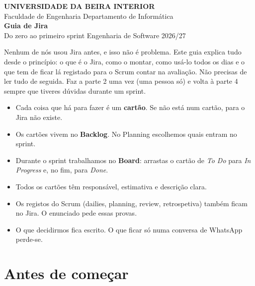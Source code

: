 \documentclass[11pt,a4paper]{article}
\begin{document}
\thispagestyle{primeira}

\begin{tcolorbox}[colback=azul, colframe=azul, coltext=white, arc=3pt, boxrule=0pt,
    left=16pt, right=16pt, top=14pt, bottom=14pt]
  \sffamily
  {\footnotesize\bfseries\MakeUppercase{Universidade da Beira Interior}}\\[2pt]
  {\footnotesize Faculdade de Engenharia \textperiodcentered{} Departamento de Informática}\\[16pt]
  {\fontsize{28}{32}\selectfont\bfseries Guia de Jira}\\[4pt]
  {\large Do zero ao primeiro sprint \textperiodcentered{} Engenharia de Software 2026/27}
\end{tcolorbox}

Nenhum de nós usou Jira antes, e isso não é problema. Este guia explica tudo desde o princípio: o que é o Jira, como o montar, como usá-lo todos os dias e o que tem de ficar lá registado para o Scrum contar na avaliação. Não precisas de ler tudo de seguida. Faz a parte 2 uma vez (uma pessoa só) e volta à parte 4 sempre que tiveres dúvidas durante um sprint.

\begin{tcolorbox}[caixa, title={O essencial em poucas linhas}, colback=azulclaro!60]
  \begin{itemize}
    \item Cada coisa que há para fazer é um \textbf{cartão}. Se não está num cartão, para o Jira não existe.
    \item Os cartões vivem no \textbf{Backlog}. No Planning escolhemos quais entram no sprint.
    \item Durante o sprint trabalhamos no \textbf{Board}: arrastas o cartão de \textit{To Do} para \textit{In Progress} e, no fim, para \textit{Done}.
    \item Todos os cartões têm responsável, estimativa e descrição clara.
    \item Os registos do Scrum (dailies, planning, review, retrospetiva) também ficam no Jira. O enunciado pede essas provas.
    \item O que decidirmos fica escrito. O que ficar só numa conversa de WhatsApp perde-se.
  \end{itemize}
\end{tcolorbox}

\section{Antes de começar}
\end{document}
